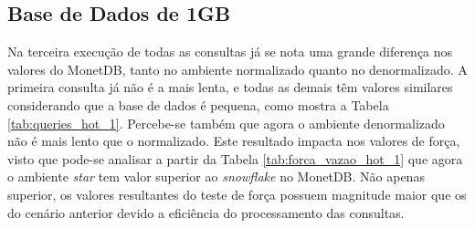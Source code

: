\subsection{Base de Dados de 1GB}

Na terceira execução de todas as consultas já se nota uma grande diferença nos valores do MonetDB, tanto no ambiente normalizado quanto no denormalizado. A primeira consulta já não é a mais lenta, e todas as demais têm valores similares considerando que a base de dados é pequena, como mostra a Tabela \ref{tab:queries_hot_1}. Percebe-se também que agora o ambiente denormalizado não é mais lento que o normalizado. Este resultado impacta nos valores de força, visto que pode-se analisar a partir da Tabela \ref{tab:forca_vazao_hot_1} que agora o ambiente \textit{star} tem valor superior ao \textit{snowflake} no MonetDB. Não apenas superior, os valores resultantes do teste de força possuem magnitude maior que os do cenário anterior devido a eficiência do processamento das consultas.

